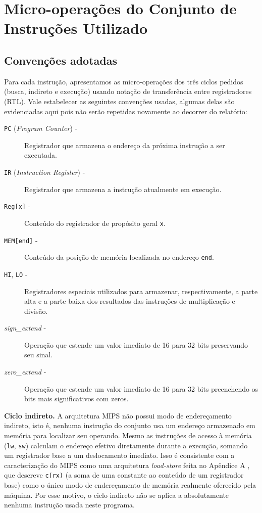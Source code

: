 \section{Micro-operações do Conjunto de Instruções Utilizado}

\label{sec:instrucoes}

\subsection{Convenções adotadas}

Para cada instrução, apresentamos as micro-operações dos três ciclos
pedidos (busca, indireto e execução) usando notação de transferência entre
registradores (RTL). Vale estabelecer as seguintes convenções usadas, algumas delas
são evidenciadas aqui pois não serão repetidas novamente ao decorrer do relatório:

\begin{description}
\item[\texttt{PC} (\textit{Program Counter}) -] Registrador que armazena o endereço da próxima instrução a ser executada.

\item[\texttt{IR} (\textit{Instruction Register}) -] Registrador que armazena a instrução atualmente em execução.

\item[\texttt{Reg[x]} -] Conteúdo do registrador de propósito geral \texttt{x}.

\item[\texttt{MEM[end]} -] Conteúdo da posição de memória localizada no endereço \texttt{end}.

\item[\texttt{HI}, \texttt{LO} -] Registradores especiais utilizados para armazenar, respectivamente, a parte alta e a parte baixa dos resultados das instruções de multiplicação e divisão.

\item[\textit{sign\_extend} -] Operação que estende um valor imediato de 16 para 32 bits preservando seu sinal.

\item[\textit{zero\_extend} -] Operação que estende um valor imediato de 16 para 32 bits preenchendo os bits mais significativos com zeros.
\end{description}

\textbf{Ciclo indireto.} A arquitetura MIPS não possui modo de
endereçamento indireto, isto é, nenhuma instrução do conjunto usa um endereço
armazenado em memória para localizar seu operando. Mesmo as instruções de
acesso à memória (\texttt{lw}, \texttt{sw}) calculam o endereço efetivo
diretamente durante a execução, somando um registrador base a um
deslocamento imediato. Isso é consistente com a caracterização do MIPS
como uma arquitetura \textit{load-store} feita no Apêndice A
\cite{patterson2017}, que descreve \texttt{c(rx)} (a soma de uma
constante ao conteúdo de um registrador base) como o único modo de
endereçamento de memória realmente oferecido pela máquina. Por esse
motivo, o ciclo indireto não se aplica a absolutamente nenhuma instrução
usada neste programa. \\


